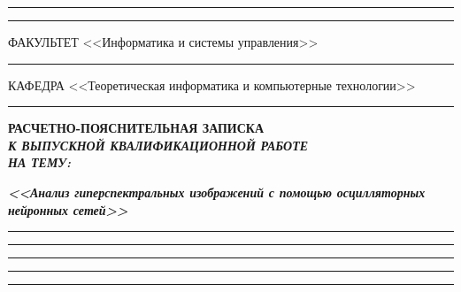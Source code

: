 \documentclass[14pt, russian]{scrartcl}
\begin{document}
\begin{titlepage}
\vspace{-2pt}
\hspace{-34.5pt}\rule{\textwidth}{0.5pt}

\vspace*{-18.3pt}
\hspace{-34.5pt}\rule{\textwidth}{2.5pt}
 
\vspace{0.5ex}
\noindent \small ФАКУЛЬТЕТ\hspace{80pt} <<Информатика и системы управления>>

\vspace*{-16pt}
\hspace{35pt}\rule{0.855\textwidth}{0.4pt}

\vspace{0.5ex}
\noindent \small КАФЕДРА\hspace{50pt} <<Теоретическая информатика и компьютерные технологии>>

\vspace*{-16pt}
\hspace{25pt}\rule{0.875\textwidth}{0.4pt}
 
 
\vspace{3em}
 
\begin{center}
\Large \bf{РАСЧЕТНО-ПОЯСНИТЕЛЬНАЯ ЗАПИСКА\\\textbf{\textit{К ВЫПУСКНОЙ КВАЛИФИКАЦИОННОЙ РАБОТЕ\\НА ТЕМУ:}} \\}
\end{center}

\vspace*{-6ex} 
\begin{center}
\Large{\textit{\textbf{<<Анализ гиперспектральных изображений с помощью осцилляторных нейронных сетей>>}}}

\vspace*{-3ex}
\rule{1\textwidth}{1.2pt}

\vspace*{-0.2ex}
\rule{1\textwidth}{1.2pt}

\vspace*{-0.2ex}
\rule{1\textwidth}{1.2pt}

\vspace*{-0.2ex}
\rule{1\textwidth}{1.2pt}

\vspace*{-0.2ex}
\rule{1\textwidth}{1.2pt}
\end{center}
 
\vspace{\fill}
 


\end{titlepage}
\end{document}
